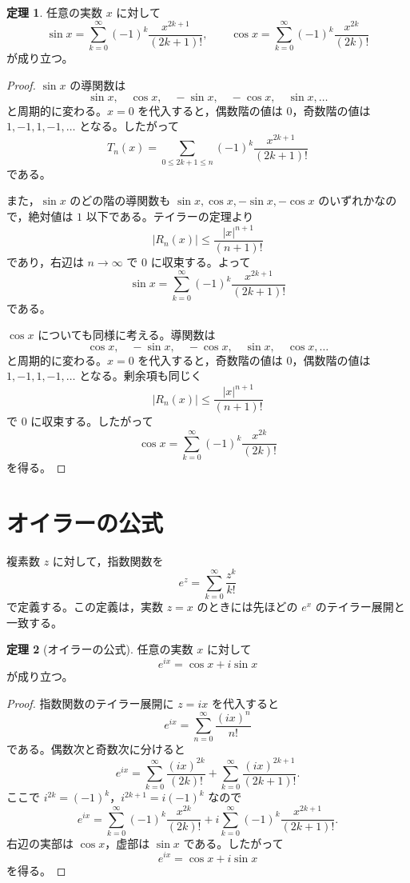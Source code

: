 \documentclass[a4paper,12pt]{jsarticle}
\theoremstyle{definition}
\newtheorem*{theorem}{定理}
\begin{document}
\begin{theorem}
任意の実数 $x$ に対して
\[
\sin x=\sum_{k=0}^{\infty}(-1)^k\frac{x^{2k+1}}{(2k+1)!},
\qquad
\cos x=\sum_{k=0}^{\infty}(-1)^k\frac{x^{2k}}{(2k)!}
\]
が成り立つ。
\end{theorem}

\begin{proof}
$\sin x$ の導関数は
\[
\sin x,\quad \cos x,\quad -\sin x,\quad -\cos x,\quad \sin x,\dots
\]
と周期的に変わる。$x=0$ を代入すると，偶数階の値は $0$，奇数階の値は $1,-1,1,-1,\dots$ となる。したがって
\[
T_n(x)=\sum_{0\leq 2k+1\leq n}(-1)^k\frac{x^{2k+1}}{(2k+1)!}
\]
である。

また，$\sin x$ のどの階の導関数も $\sin x,\cos x,-\sin x,-\cos x$ のいずれかなので，絶対値は $1$ 以下である。テイラーの定理より
\[
|R_n(x)|\leq \frac{|x|^{n+1}}{(n+1)!}
\]
であり，右辺は $n\to\infty$ で $0$ に収束する。よって
\[
\sin x=\sum_{k=0}^{\infty}(-1)^k\frac{x^{2k+1}}{(2k+1)!}
\]
である。

$\cos x$ についても同様に考える。導関数は
\[
\cos x,\quad -\sin x,\quad -\cos x,\quad \sin x,\quad \cos x,\dots
\]
と周期的に変わる。$x=0$ を代入すると，奇数階の値は $0$，偶数階の値は $1,-1,1,-1,\dots$ となる。剰余項も同じく
\[
|R_n(x)|\leq \frac{|x|^{n+1}}{(n+1)!}
\]
で $0$ に収束する。したがって
\[
\cos x=\sum_{k=0}^{\infty}(-1)^k\frac{x^{2k}}{(2k)!}
\]
を得る。
\end{proof}

\section{オイラーの公式}

複素数 $z$ に対して，指数関数を
\[
e^z=\sum_{k=0}^{\infty}\frac{z^k}{k!}
\]
で定義する。この定義は，実数 $z=x$ のときには先ほどの $e^x$ のテイラー展開と一致する。

\begin{theorem}[オイラーの公式]
任意の実数 $x$ に対して
\[
e^{ix}=\cos x+i\sin x
\]
が成り立つ。
\end{theorem}

\begin{proof}
指数関数のテイラー展開に $z=ix$ を代入すると
\[
e^{ix}=\sum_{n=0}^{\infty}\frac{(ix)^n}{n!}
\]
である。偶数次と奇数次に分けると
\[
e^{ix}
=\sum_{k=0}^{\infty}\frac{(ix)^{2k}}{(2k)!}
+\sum_{k=0}^{\infty}\frac{(ix)^{2k+1}}{(2k+1)!}.
\]
ここで $i^{2k}=(-1)^k$，$i^{2k+1}=i(-1)^k$ なので
\[
e^{ix}
=\sum_{k=0}^{\infty}(-1)^k\frac{x^{2k}}{(2k)!}
+i\sum_{k=0}^{\infty}(-1)^k\frac{x^{2k+1}}{(2k+1)!}.
\]
右辺の実部は $\cos x$，虚部は $\sin x$ である。したがって
\[
e^{ix}=\cos x+i\sin x
\]
を得る。
\end{proof}
\end{document}
